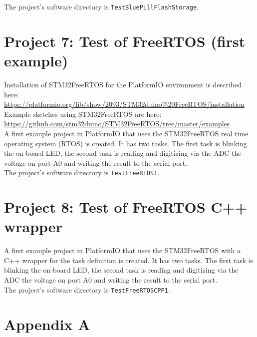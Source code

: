 \documentclass[11pt, oneside]{scrartcl}   	%
\begin{document}
The project's software directory is \verb!TestBluePillFlashStorage!.

\section{Project 7: Test of FreeRTOS (first example)}
Installation of STM32FreeRTOS for the PlatformIO environment is described here:\\
\href{https://platformio.org/lib/show/2093/STM32duino\%20FreeRTOS/installation}{https://platformio.org/lib/show/2093/STM32duino\%20FreeRTOS/installation}\\
Example sketches using STM32FreeRTOS are here:\\
\href{https://github.com/stm32duino/STM32FreeRTOS/tree/master/examples}{https://github.com/stm32duino/STM32FreeRTOS/tree/master/examples}\\

A first example project in PlatformIO that uses the STM32FreeRTOS real time operating system (RTOS) is created. It has two tasks. The first task is blinking the on-board LED, 
the second task is reading and digitizing via the ADC the voltage on port A0 and writing the result to the serial port.\\
The project's software directory is \verb!TestFreeRTOS1!.

\section{Project 8: Test of FreeRTOS C++ wrapper}
A first example project in PlatformIO that uses the STM32FreeRTOS with a C++ wrapper for the task definition is created. 
It has two tasks. The first task is blinking the on-board LED, 
the second task is reading and digitizing via the ADC the voltage on port A0 and writing the result to the serial port.\\
The project's software directory is \verb!TestFreeRTOSCPP1!.

\newpage
\appendix
\section{Appendix A}
\end{document}
